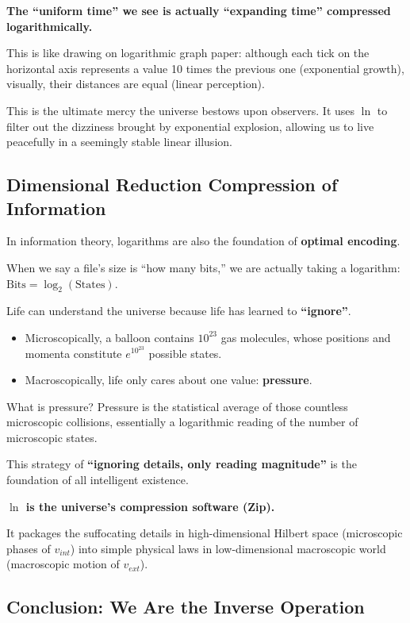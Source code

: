 \textbf{The ``uniform time'' we see is actually ``expanding time'' compressed logarithmically.}

This is like drawing on logarithmic graph paper: although each tick on the horizontal axis represents a value 10 times the previous one (exponential growth), visually, their distances are equal (linear perception).

This is the ultimate mercy the universe bestows upon observers. It uses $\ln$ to filter out the dizziness brought by exponential explosion, allowing us to live peacefully in a seemingly stable linear illusion.

\subsection{Dimensional Reduction Compression of Information}

In information theory, logarithms are also the foundation of \textbf{optimal encoding}.

When we say a file's size is ``how many bits,'' we are actually taking a logarithm: $\text{Bits} = \log_2(\text{States})$.

Life can understand the universe because life has learned to \textbf{``ignore''}.

\begin{itemize}
\item Microscopically, a balloon contains $10^{23}$ gas molecules, whose positions and momenta constitute $e^{10^{23}}$ possible states.

\item Macroscopically, life only cares about one value: \textbf{pressure}.
\end{itemize}

What is pressure? Pressure is the statistical average of those countless microscopic collisions, essentially a logarithmic reading of the number of microscopic states.

This strategy of \textbf{``ignoring details, only reading magnitude''} is the foundation of all intelligent existence.

\textbf{$\ln$ is the universe's compression software (Zip).}

It packages the suffocating details in high-dimensional Hilbert space (microscopic phases of $v_{int}$) into simple physical laws in low-dimensional macroscopic world (macroscopic motion of $v_{ext}$).

\subsection{Conclusion: We Are the Inverse Operation}

